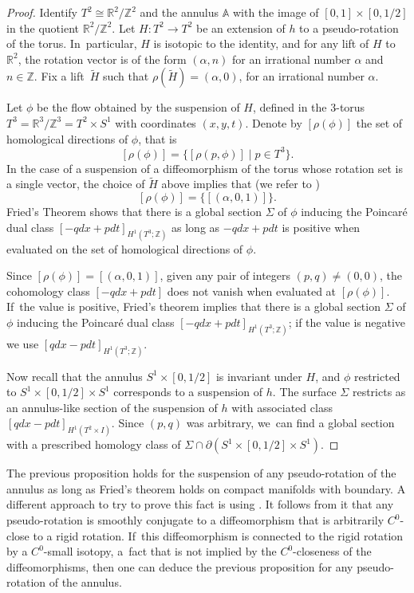 \begin{proof}
Identify $T^2\cong \mathbb{R}^2/\mathbb{Z}^2$ and the annulus $\mathbb{A}$ with the image of $[0,1]\times [0,1/2]$ in the quotient $\mathbb{R}^2/\mathbb{Z}^2$. Let $H: T^2 \to T^2$
be an extension of $h$ to a pseudo-rotation of the torus. In~particular, $H$ is isotopic to the identity, and for any lift of $H$ to $\mathbb{R}^2$, the rotation vector is of the form $(\alpha,n)$ for an irrational number $\alpha$ and $n\in \mathbb{Z}$. Fix a lift~$\widetilde H$ such that $\rho(\widetilde H)=(\alpha,0)$, for an irrational number $\alpha$.

Let $\phi$ be the flow obtained by the suspension of $H$, defined in the 3-torus $T^3=\mathbb{R}^3/\mathbb{Z}^3=T^2\times S^1$ with coordinates $(x,y,t)$.
Denote by $[\rho(\phi)]$ the set of homological directions of $\phi$, that is
\[
[\rho(\phi)]=\{ [\rho(p,\phi)]\mid p\in T^3\}.
\]
In the case of a suspension of a diffeomorphism of the torus whose rotation set is a single vector, the choice of $\widetilde H$ above implies that (we refer to \cite[Eq.\,2.2]{K1})
\[
[\rho(\phi)]=\{[(\alpha,0,1)]\}.
\]
Fried's Theorem \cite[Th.\,D]{Fr} shows that there is a global section $\Sigma$ of $\phi$ inducing the Poincaré dual class $[-qdx+pdt]_{H^1(T^3;\mathbb{Z})}$ as long as $-qdx+pdt$ is positive when evaluated on the set of homological directions of $\phi$.

{Since $[\rho(\phi)]=[(\alpha,0,1)]$}, given any pair of integers $(p,q)\neq (0,0)$, the cohomology class $[-qdx+pdt]$ does not vanish when evaluated at $[\rho(\phi)]$. If~the value is positive, Fried's theorem implies that there is a global section $\Sigma$ of $\phi$ inducing the Poincaré dual class $[-qdx+pdt]_{H^1({T}^3;\mathbb{Z})}$; if the value is negative we use $[qdx-pdt]_{H^1(T^3;\mathbb{Z})}$.

Now recall that the annulus $S^1\times [0,1/2]$ is invariant under $H$, and $\phi$ restricted to $S^1\times[0,1/2]\times S^1$ corresponds to a suspension of $h$. The surface $\Sigma$ restricts as an annulus-like section of the suspension of $h$ with associated class $[qdx-pdt]_{H^1(T^2\times I)}$. Since $(p,q)$ was arbitrary, we~can find a global section with a prescribed homology class of $\Sigma\cap \partial (S^1\times [0,1/2] \times S^1)$.
\end{proof}

\begin{Remark}
The previous proposition holds for the suspension of any pseudo-rotation of the annulus as long as Fried's theorem holds on compact manifolds with boundary. A different approach to try to prove this fact is using \cite[Prop.\,5.1]{BCLP}. It follows from it that any pseudo-rotation is smoothly conjugate to a diffeomorphism that is arbitrarily $C^0$-close to a rigid rotation. If~this diffeomorphism is connected to the rigid rotation by a $C^0$-small isotopy, a~fact that is not implied by the $C^0$-closeness of the diffeomorphisms, then one can deduce the previous proposition for any pseudo-rotation of the annulus.
\end{Remark}

